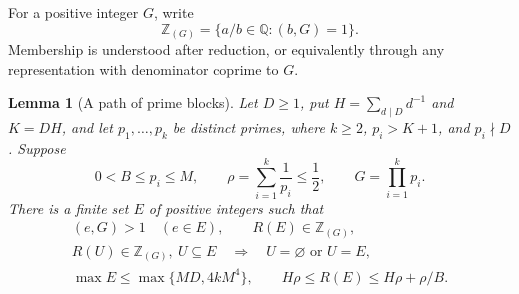 \documentclass[11pt,leqno]{amsart}
\numberwithin{equation}{section}
\newtheorem{lemma}[theorem]{Lemma}
\theoremstyle{definition}
\theoremstyle{remark}
\newcommand{\Z}{\mathbb Z}
\newcommand{\Q}{\mathbb Q}
\begin{document}
For a positive integer $G$, write
\[
 \Z_{(G)}=\{a/b\in\Q:(b,G)=1\}.
\]
Membership is understood after reduction, or equivalently through any
representation with denominator coprime to $G$.

\begin{lemma}[A path of prime blocks]\label{lem:path}
Let $D\ge1$, put $H=\sum_{d\mid D}d^{-1}$ and $K=DH$, and let
$p_1,\ldots,p_k$ be distinct primes, where $k\ge2$,
$p_i>K+1$, and $p_i\nmid D$. Suppose
\[
 0<B\le p_i\le M,\qquad \rho=\sum_{i=1}^k\frac1{p_i}\le\frac12,
 \qquad G=\prod_{i=1}^k p_i.
\]
There is a finite set $E$ of positive integers such that
\begin{gather}
 (e,G)>1\quad(e\in E),\qquad R(E)\in\Z_{(G)},\label{eq:path1}\\
 R(U)\in\Z_{(G)},\ U\subseteq E
 \quad\Longrightarrow\quad U=\varnothing\text{ or }U=E,\label{eq:path2}\\
 \max E\le\max\{MD,4kM^4\},\qquad
 H\rho\le R(E)\le H\rho+\rho/B.\label{eq:path3}
\end{gather}
\end{lemma}
\end{document}
